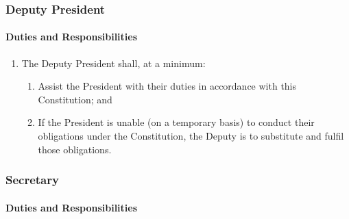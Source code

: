 \documentclass[a4paper,titlepage,8.5pt]{article}
\begin{document}
\subsubsection{Deputy President}

\paragraph{Duties and Responsibilities}

\begin{enumerate}
\item The Deputy President shall, at a minimum:
\begin{enumerate}
\item Assist the President with their duties in accordance with this Constitution; and
\item If the President is unable (on a temporary basis) to conduct their obligations under the Constitution, the Deputy is to substitute and fulfil those obligations.
\end{enumerate}
\end{enumerate}

\subsubsection{Secretary}

\paragraph{Duties and Responsibilities}
\end{document}
